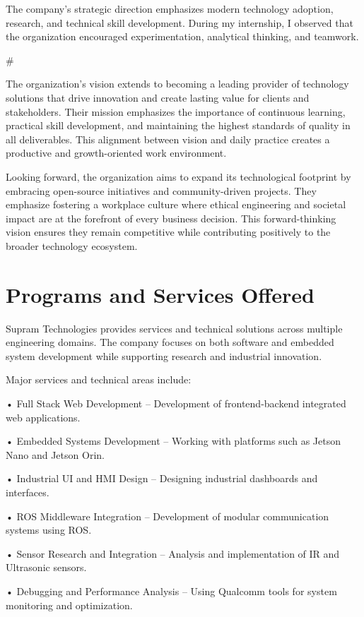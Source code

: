 \documentclass[12pt,a4paper]{report}
\begin{document}
The company’s strategic direction emphasizes modern technology adoption, research, and technical skill development. During my internship, I observed that the organization encouraged experimentation, analytical thinking, and teamwork.


\#


The organization's vision extends to becoming a leading provider of technology solutions that drive innovation and create lasting value for clients and stakeholders. Their mission emphasizes the importance of continuous learning, practical skill development, and maintaining the highest standards of quality in all deliverables. This alignment between vision and daily practice creates a productive and growth-oriented work environment.


Looking forward, the organization aims to expand its technological footprint by embracing open-source initiatives and community-driven projects. They emphasize fostering a workplace culture where ethical engineering and societal impact are at the forefront of every business decision. This forward-thinking vision ensures they remain competitive while contributing positively to the broader technology ecosystem.


\section{Programs and Services Offered}

Supram Technologies provides services and technical solutions across multiple engineering domains. The company focuses on both software and embedded system development while supporting research and industrial innovation.


Major services and technical areas include:


• Full Stack Web Development – Development of frontend-backend integrated web applications.


• Embedded Systems Development – Working with platforms such as Jetson Nano and Jetson Orin.


• Industrial UI and HMI Design – Designing industrial dashboards and interfaces.


• ROS Middleware Integration – Development of modular communication systems using ROS.


• Sensor Research and Integration – Analysis and implementation of IR and Ultrasonic sensors.


• Debugging and Performance Analysis – Using Qualcomm tools for system monitoring and optimization.
\end{document}
